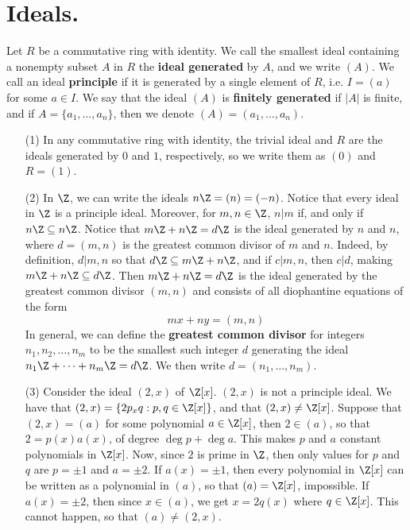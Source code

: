 \section{Ideals.}

\begin{definition}
    Let $R$ be a commutative ring with identity. We call the smallest ideal
    containing a nonempty subset $A$ in $R$ the  \textbf{ideal generated} by
    $A$, and we write $(A)$. We call an ideal \textbf{principle} if it is
    generated by a single element of $R$, i.e. $I=(a)$ for some $a \in I$. We
    say that the ideal $(A)$ is \textbf{finitely generated} if $|A|$ is finite,
    and if  $A=\{a_1, \dots, a_n\}$, then we denote $(A)=(a_1, \dots, a_n)$.
\end{definition}

\begin{example}\label{1.13}
    \begin{enumerate}
        \item[(1)] In any commutative ring with identity, the trivial ideal and
            $R$ are the ideals generated by $0$ and $1$, respectively, so we
            write them as $(0)$ and $R=(1)$.

        \item[(2)] In $\Z$, we can write the ideals  $n\Z=(n)=(-n)$. Notice that
            every ideal in $\Z$ is a principle ideal. Moreover, for $m,n \in
            \Z$, $n|m$ if, and only if  $n\Z \subseteq n\Z$. Notice that
            $m\Z+n\Z=d\Z$ is the ideal generated by $n$ and $n$, where $d=(m,n)$
            is the greatest common divisor of $m$ and  $n$. Indeed, by
            definition, $d|m,n$ so that $d\Z \subseteq m\Z+n\Z$, and if
            $c|m,n$, then  $c|d$, making  $m\Z+n\Z \subseteq d\Z$. Then
            $m\Z+n\Z=d\Z$ is the ideal generated by the greatest common divisor
             $(m,n)$ and consists of all diophantine equations of the form
             \begin{equation*}
                 mx+ny=(m,n)
             \end{equation*}
             In general, we can define the \textbf{greatest common divisor} for
             integers $n_1, n_2, \dots, n_m$ to be the smallest such integer $d$
             generating the ideal $n_1\Z+\dots+n_m\Z=d\Z$. We then write
             $d=(n_1, \dots, n_m)$.

         \item[(3)] Consider the ideal $(2,x)$ of $\Z[x]$. $(2,x)$ is not a
             principle ideal. We have that $(2,x)=\{2p_xq : p,q \in \Z[x]\}$,
             and that $(2,x) \neq \Z[x]$. Suppose that $(2,x)=(a)$ for some
             polynomial $a \in \Z[x]$, then $2 \in (a)$, so that $2=p(x)a(x)$,
             of degree $\deg{p}+\deg{a}$. This makes $p$ and $a$ constant
             polynomials in $\Z[x]$. Now, since $2$ is prime in $\Z$, then only
             values for $p$ and  $q$ are  $p=\pm1$ and $a=\pm2$. If $a(x)=\pm1$,
             then every polynomial in $\Z[x]$ can be written as a polynomial in
             $(a)$, so that $(a)=\Z[x]$, impossible. If $a(x)=\pm2$, then since
             $x \in (a)$, we get $x=2q(x)$ where $q \in \Z[x]$. This cannot
             happen, so that $(a) \neq (2,x)$.


\end{enumerate}
\end{example}
